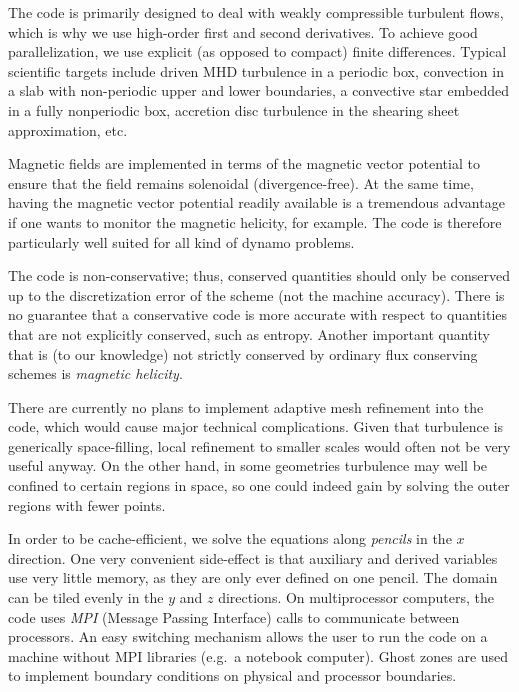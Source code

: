 \documentclass[12pt,twoside,notitlepage,a4paper]{article}
\newcommand{\name}[1]{\textsl{#1}\index{#1}\/}
\begin{document}
The code is primarily designed to deal with weakly compressible turbulent
flows, which is why we use high-order first and second derivatives.
To achieve good parallelization, we use explicit
(as opposed to compact) finite differences.
Typical scientific targets include driven MHD turbulence in a periodic box,
convection in a slab with non-periodic upper and lower boundaries,
a convective star embedded in a fully nonperiodic box, accretion disc
turbulence in the shearing sheet approximation, etc.

Magnetic fields are implemented in terms of the magnetic vector potential
to ensure that the field remains solenoidal (divergence-free).
At the same time, having the magnetic
vector potential readily available is a tremendous advantage if
one wants to monitor the magnetic helicity, for example.
The code is therefore particularly well suited for all kind of
dynamo problems.

The code is non-conservative; thus, conserved quantities should only be
conserved up to the discretization error of the scheme (not the machine
accuracy).
There is no guarantee that a conservative code is more accurate with
respect to quantities that are not explicitly conserved, such as entropy.
Another important quantity that is (to our knowledge) not strictly
conserved by ordinary flux conserving schemes is \name{magnetic helicity}.

There are currently no plans to implement adaptive mesh refinement
into the code, which would cause major technical complications.
Given that turbulence is generically space-filling, local refinement
to smaller scales would often not be very useful anyway.
On the other hand, in some geometries
turbulence may well be confined to certain regions in space, so one
could indeed gain by solving the outer regions with fewer points.

In order to be cache-efficient, we solve the equations along
\name{pencils} in the $x$ direction.
One very convenient side-effect is that auxiliary and derived variables
use very little memory, as they are only ever defined on one pencil.
The domain can be tiled evenly in the $y$ and $z$ directions.
On multiprocessor computers, the code uses \name{MPI}
(Message Passing Interface) calls to communicate between processors.
An easy switching mechanism allows the user to run the code on a machine
without MPI libraries (e.g.~a notebook computer).
Ghost zones are used to implement boundary conditions on physical and
processor boundaries.
\end{document}

